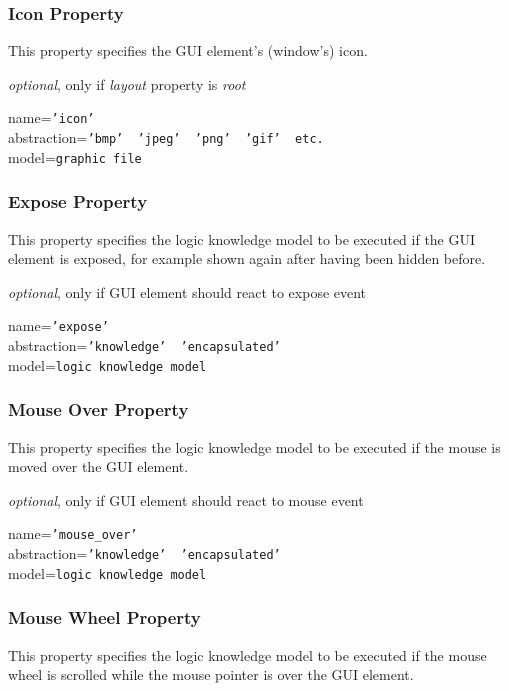\subsubsection{Icon Property}

This property specifies the GUI element's (window's) icon.

\emph{optional}, only if \emph{layout} property is \emph{root}

name=\texttt{'icon'}\\
abstraction=\texttt{'bmp' \vline\ 'jpeg' \vline\ 'png' \vline\ 'gif' \vline\ etc.}\\
model=\texttt{graphic file}

\subsubsection{Expose Property}

This property specifies the logic knowledge model to be executed if the GUI
element is exposed, for example shown again after having been hidden before.

\emph{optional}, only if GUI element should react to expose event

name=\texttt{'expose'}\\
abstraction=\texttt{'knowledge' \vline\ 'encapsulated'}\\
model=\texttt{logic knowledge model}

\subsubsection{Mouse Over Property}

This property specifies the logic knowledge model to be executed if the mouse
is moved over the GUI element.

\emph{optional}, only if GUI element should react to mouse event

name=\texttt{'mouse\_over'}\\
abstraction=\texttt{'knowledge' \vline\ 'encapsulated'}\\
model=\texttt{logic knowledge model}

\subsubsection{Mouse Wheel Property}

This property specifies the logic knowledge model to be executed if the mouse
wheel is scrolled while the mouse pointer is over the GUI element.

